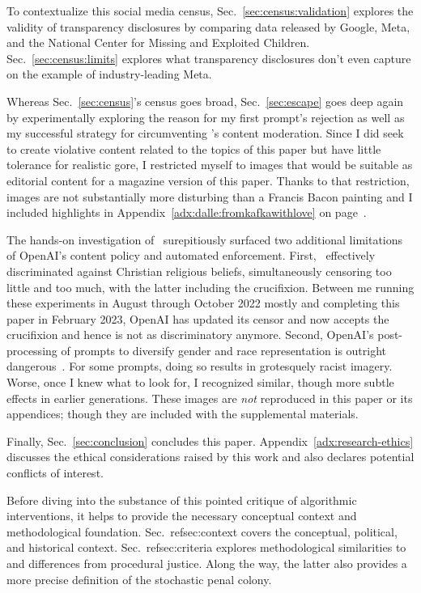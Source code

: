 To contextualize this social media census, Sec.\ \ref{sec:census:validation}
explores the validity of transparency disclosures by comparing data released by
Google, Meta, and the National Center for Missing and Exploited Children.
Sec.~\ref{sec:census:limits} explores what transparency disclosures don't even
capture on the example of industry-leading Meta.

Whereas Sec.~\ref{sec:census}'s census goes broad, Sec.~\ref{sec:escape} goes
deep again by experimentally exploring the reason for my first prompt's
rejection as well as my successful strategy for circumventing \DALLE's content
moderation. Since I did seek to create violative content related to the topics
of this paper but have little tolerance for realistic gore, I restricted myself
to images that would be suitable as editorial content for a magazine version of
this paper. Thanks to that restriction, images are not substantially more
disturbing than a Francis Bacon painting and I included highlights in
Appendix~\ref{adx:dalle:fromkafkawithlove} on
page~\pageref{adx:dalle:fromkafkawithlove}.

The hands-on investigation of \DALLE\ surepitiously surfaced two additional
limitations of OpenAI's content policy and automated enforcement. First, \DALLE\
effectively discriminated against Christian religious beliefs, simultaneously
censoring too little and too much, with the latter including the crucifixion.
Between me running these experiments in August through October 2022 mostly and
completing this paper in February 2023, OpenAI has updated its censor and now
accepts the crucifixion and hence is not as discriminatory anymore. Second,
OpenAI's post-processing of prompts to diversify gender and race representation
is outright dangerous~\cite{OpenAI2022e,Sparkes2022}. For some prompts, doing so
results in grotesquely racist imagery. Worse, once I knew what to look for, I
recognized similar, though more subtle effects in earlier generations. These
images are \emph{not} reproduced in this paper or its appendices; though they
are included with the supplemental materials.

Finally, Sec.\ \ref{sec:conclusion} concludes this paper.
Appendix~\ref{adx:research-ethics} discusses the ethical considerations raised
by this work and also declares potential conflicts of interest.

Before diving into the substance of this pointed critique of algorithmic
interventions, it helps to provide the necessary conceptual context and
methodological foundation. Sec.\ ref{sec:context} covers the conceptual,
political, and historical context. Sec.\ ref{sec:criteria} explores
methodological similarities to and differences from procedural justice. Along
the way, the latter also provides a more precise definition of the stochastic
penal colony.



